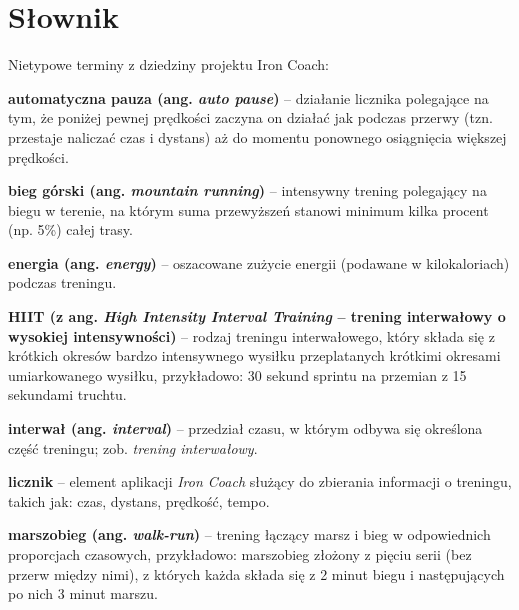 

\newcommand{\dicen}[1]{
\item\textbf{#1}
}




\section{Słownik}
\noindent Nietypowe terminy z dziedziny projektu Iron Coach:
\begin{multicols}{2}
\begin{description}
	\dicen{automatyczna pauza (ang. \textit{auto pause})}-- działanie licznika polegające na tym, że poniżej pewnej prędkości zaczyna on działać jak podczas przerwy (tzn. przestaje naliczać czas i dystans) aż do momentu ponownego osiągnięcia większej prędkości.\\
	\dicen{bieg górski (ang. \textit{mountain running})}-- intensywny trening polegający na biegu w terenie, na którym suma przewyższeń stanowi minimum kilka procent (np. 5\%) całej trasy.\\
	\dicen{energia (ang. \textit{energy})}-- oszacowane zużycie energii (podawane w kilokaloriach) podczas treningu.\\
	\dicen{HIIT (z ang. \textit{High Intensity Interval Training} -- trening interwałowy o wysokiej intensywności)}-- rodzaj treningu interwałowego, który składa się z krótkich okresów bardzo intensywnego wysiłku przeplatanych krótkimi okresami umiarkowanego wysiłku, przykładowo: 30 sekund sprintu na przemian z 15 sekundami truchtu.\\
	\dicen{interwał (ang. \textit{interval})}-- przedział czasu, w którym odbywa się określona część treningu; zob. \textit{trening interwałowy}.\\
	\dicen{licznik}-- element aplikacji \textit{Iron Coach} służący do zbierania informacji o treningu, takich jak: czas, dystans, prędkość, tempo.\\
	\dicen{marszobieg (ang. \textit{walk-run})}-- trening łączący marsz i bieg w odpowiednich proporcjach czasowych, przykładowo: marszobieg złożony z pięciu serii (bez przerw między nimi), z których każda składa się z 2 minut biegu i następujących po nich 3 minut marszu.\\

\end{description}
\end{multicols}
